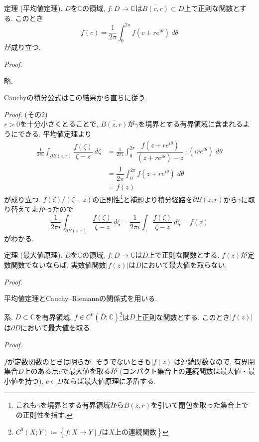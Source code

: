 \documentclass{jsarticle}
\newcommand{\C}{\mathbb{C}}%
\renewenvironment{proof}[1][Proof]{%
\begin{proofbox}%
\textit{#1. }\ignorespaces
}{%
\hfill\qedsymbol%
\end{proofbox}%
}
\begin{document}
\begin{thm}{定理 (平均値定理).}
$D$を$\C$の領域, $f\colon D\to \C$は$\overline{B(c, r)}\subset D$上で正則な関数とする. このとき
\[
f(c) = \dfrac{1}{2\pi}\int_{0}^{2\pi}f(c+re^{i\theta})\:d\theta
\] 
が成り立つ.
\end{thm}
\begin{proof}
略.
\end{proof}
\vspace{1em}
Cauchyの積分公式はこの結果から直ちに従う.
\begin{proof}(その2)\\
$r>0$を十分小さくとることで, $\overline{B(z,r)}$が$\gamma$を境界とする有界領域に含まれるようにできる. 平均値定理より
\begin{align*}
\frac{1}{2\pi i}\int_{\partial B(z,r)}\dfrac{f(\zeta)}{\zeta-z}\:d\zeta & = \frac{1}{2\pi i}\int_{0}^{2\pi}\dfrac{f(z+re^{i\theta})}{(z+re^{i\theta})-z}\cdot(ire^{i\theta})\;d\theta \\
& = \dfrac{1}{2\pi}\int_{0}^{2\pi} f(z+re^{i\theta})\;d\theta \\
& = f(z)
\end{align*}
が成り立つ. $f(\zeta) / (\zeta-z)$の正則性\footnote{これも$\gamma$を境界とする有界領域から$B(z, r)$を引いて閉包を取った集合上での正則性を指す.}と補題より積分経路を$\partial B(z, r)$から$\gamma$に取り替えてよかったので
\[
\frac{1}{2\pi i}\int_{\partial B(z,r)}\dfrac{f(\zeta)}{\zeta-z}\:d\zeta = \frac{1}{2\pi i}\int_{\gamma}\dfrac{f(\zeta)}{\zeta-z}\:d\zeta =  f(z)
\]
がわかる.
\end{proof}

\begin{thm}{定理 (最大値原理).}
$D$を$\C$の領域, $f\colon D\to \C$は$D$上で正則な関数とする. $f(z)$が定数関数でないならば, 実数値関数$\left|f(z)\right|$は$D$において最大値を取らない.
\end{thm}
\begin{proof}
平均値定理とCauchy--Riemannの関係式を用いる.
\end{proof}

\begin{cor}{系.}
$D\subset\C$を有界領域, $f\in C^{0}(\overline{D}; \C)$\footnote{$C^{0}(X; Y)\coloneq\left\{f\colon X\to Y\;|\; f\text{は}X\text{上の連続関数}\right\}$}は$D$上正則な関数とする. このとき$|f(z)|$は$\partial D$において最大値を取る.
\end{cor}
\begin{proof}
$f$が定数関数のときは明らか. そうでないときも$|f(z)|$は連続関数なので, 有界閉集合$\overline{D}$上のある点$c$で最大値を取るが (コンパクト集合上の連続関数は最大値・最小値を持つ), $c\in D$ならば最大値原理に矛盾する.
\end{proof}
\end{document}

